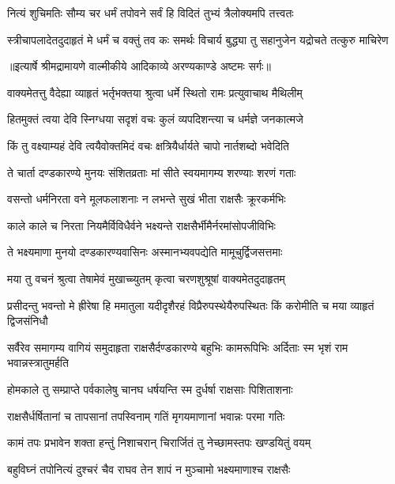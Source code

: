 \twolineshloka
{नित्यं शुचिमतिः सौम्य चर धर्मं तपोवने}
{सर्वं हि विदितं तुभ्यं त्रैलोक्यमपि तत्त्वतः} %

\fourlineindentedshloka
{स्त्रीचापलादेतदुदाहृतं मे}
{धर्मं च वक्तुं तव कः समर्थः}
{विचार्य बुद्ध्या तु सहानुजेन}
{यद्रोचते तत्कुरु माचिरेण} %


{॥इत्यार्षे श्रीमद्रामायणे वाल्मीकीये आदिकाव्ये अरण्यकाण्डे अष्टमः सर्गः॥}


\twolineshloka
{वाक्यमेतत्तु वैदेह्या व्याहृतं भर्तृभक्तया}
{श्रुत्वा धर्मे स्थितो रामः प्रत्युवाचाथ मैथिलीम्} %

\twolineshloka
{हितमुक्तं त्वया देवि स्निग्धया सदृशं वचः}
{कुलं व्यपदिशन्त्या च धर्मज्ञे जनकात्मजे} %

\twolineshloka
{किं तु वक्ष्याम्यहं देवि त्वयैवोक्तमिदं वचः}
{क्षत्रियैर्धार्यते चापो नार्तशब्दो भवेदिति} %

\twolineshloka
{ते चार्ता दण्डकारण्ये मुनयः संशितव्रताः}
{मां सीते स्वयमागम्य शरण्याः शरणं गताः} %

\twolineshloka
{वसन्तो धर्मनिरता वने मूलफलाशनाः}
{न लभन्ते सुखं भीता राक्षसैः क्रूरकर्मभिः} %

\twolineshloka
{काले काले च निरता नियमैर्विविधैर्वने}
{भक्ष्यन्ते राक्षसैर्भीमैर्नरमांसोपजीविभिः} %

\twolineshloka
{ते भक्ष्यमाणा मुनयो दण्डकारण्यवासिनः}
{अस्मानभ्यवपद्येति मामूचुर्द्विजसत्तमाः} %

\twolineshloka
{मया तु वचनं श्रुत्वा तेषामेवं मुखाच्च्युतम्}
{कृत्वा चरणशुश्रूषां वाक्यमेतदुदाहृतम्} %

\threelineshloka
{प्रसीदन्तु भवन्तो मे ह्रीरेषा हि ममातुला}
{यदीदृशैरहं विप्रैरुपस्थेयैरुपस्थितः}
{किं करोमीति च मया व्याहृतं द्विजसंनिधौ} %

\threelineshloka
{सर्वैरेव समागम्य वागियं समुदाहृता}
{राक्षसैर्दण्डकारण्ये बहुभिः कामरूपिभिः}
{अर्दिताः स्म भृशं राम भवान्नस्त्रातुमर्हति} %

\twolineshloka
{होमकाले तु सम्प्राप्ते पर्वकालेषु चानघ}
{धर्षयन्ति स्म दुर्धर्षा राक्षसाः पिशिताशनाः} %

\twolineshloka
{राक्षसैर्धर्षितानां च तापसानां तपस्विनाम्}
{गतिं मृगयमाणानां भवान्नः परमा गतिः} %

\twolineshloka
{कामं तपः प्रभावेन शक्ता हन्तुं निशाचरान्}
{चिरार्जितं तु नेच्छामस्तपः खण्डयितुं वयम्} %

\twolineshloka
{बहुविघ्नं तपोनित्यं दुश्चरं चैव राघव}
{तेन शापं न मुञ्चामो भक्ष्यमाणाश्च राक्षसैः} %


